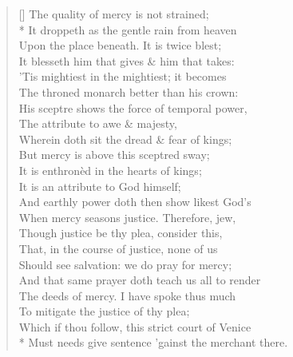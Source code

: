 \documentclass[MAIN]{subfiles}
\begin{document}
\settowidth{\versewidth}{Must needs give sentence 'gainst the merchant there.}
\begin{verse}[\versewidth]
The quality of mercy is not strained;\\*
It droppeth as the gentle rain from heaven\\
Upon the place beneath. It is twice blest;\\
It blesseth him that gives \& him that takes:\\
'Tis mightiest in the mightiest; it becomes\\
The throned monarch better than his crown:\\
His sceptre shows the force of temporal power,\\
The attribute to awe \& majesty,\\
Wherein doth sit the dread \& fear of kings;\\
But mercy is above this sceptred sway;\\
It is enthron\`ed in the hearts of kings;\\
It is an attribute to God himself;\\
And earthly power doth then show likest God's\\
When mercy seasons justice. Therefore, jew,\\
Though justice be thy plea, consider this,\\
That, in the course of justice, none of us\\
Should see salvation: we do pray for mercy;\\
And that same prayer doth teach us all to render\\
The deeds of mercy. I have spoke thus much\\
To mitigate the justice of thy plea;\\
Which if thou follow, this strict court of {\sc Venice}\\*
Must needs give sentence 'gainst the merchant there.
\end{verse}
\end{document}

